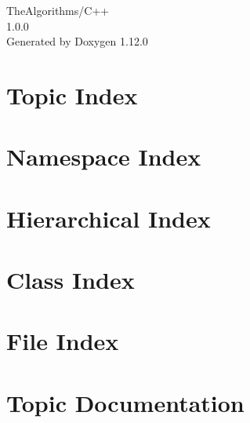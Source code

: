 \documentclass[twoside]{book}
\newcommand{\+}{\discretionary{\mbox{\scriptsize$\hookleftarrow$}}{}{}}
\newcommand{\clearemptydoublepage}{%
    \newpage{\pagestyle{empty}\cleardoublepage}%
  }
\begin{document}
  \raggedbottom
    \hypersetup{pageanchor=false,
                bookmarksnumbered=true,
                pdfencoding=unicode
               }
  \begin{titlepage}
  \vspace*{7cm}
  \begin{center}%
  {\Large The\+Algorithms/\+C++}\\
  [1ex]\large 1.\+0.\+0 \\
  \vspace*{1cm}
  {\large Generated by Doxygen 1.12.0}\\
  \end{center}
  \end{titlepage}
  \clearemptydoublepage
  \tableofcontents
  \clearemptydoublepage
  \hypersetup{pageanchor=true}








\chapter{Topic Index}

\chapter{Namespace Index}

\chapter{Hierarchical Index}

\chapter{Class Index}

\chapter{File Index}

\chapter{Topic Documentation}




\end{document}
